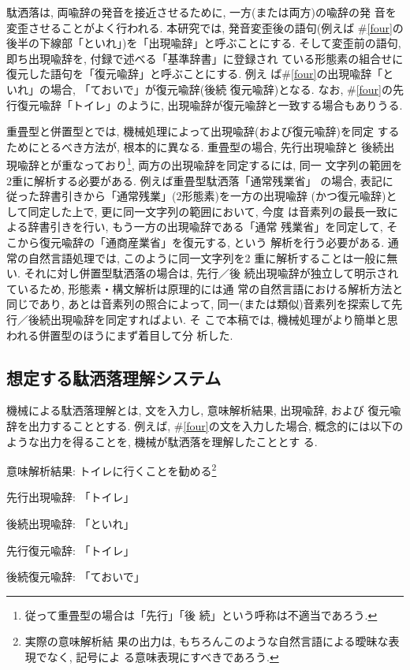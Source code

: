 駄洒落は, 両喩辞の発音を接近させるために, 一方(または両方)の喩辞の発
音を変歪させることがよく行われる. 本研究では, 発音変歪後の語句(例えば
\#\ref{four}の後半の下線部「といれ」)を「出現喩辞」と呼ぶことにする. 
そして変歪前の語句, 即ち出現喩辞を, 付録で述べる「基準辞書」に登録され
ている形態素の組合せに復元した語句を「復元喩辞」と呼ぶことにする. 例え
ば\#\ref{four}の出現喩辞「といれ」の場合, 「ておいで」が復元喩辞(後続
復元喩辞)となる. なお, \#\ref{four}の先行復元喩辞「トイレ」のように, 
出現喩辞が復元喩辞と一致する場合もありうる.  
 
重畳型と併置型とでは, 機械処理によって出現喩辞(および復元喩辞)を同定
するためにとるべき方法が, 根本的に異なる. 重畳型の場合, 先行出現喩辞と
後続出現喩辞とが重なっており\footnote{従って重畳型の場合は「先行」「後
続」という呼称は不適当であろう. }, 両方の出現喩辞を同定するには, 同一 
文字列の範囲を2重に解析する必要がある. 例えば重畳型駄洒落「通常残業省」
の場合, 表記に従った辞書引きから「通常残業」(2形態素)を一方の出現喩辞
(かつ復元喩辞)として同定した上で, 更に同一文字列の範囲において, 今度
は音素列の最長一致による辞書引きを行い, もう一方の出現喩辞である「通常
残業省」を同定して, そこから復元喩辞の「通商産業省」を復元する, という
解析を行う必要がある. 通常の自然言語処理では, このように同一文字列を2
重に解析することは一般に無い. それに対し併置型駄洒落の場合は, 先行／後
続出現喩辞が独立して明示されているため, 形態素・構文解析は原理的には通
常の自然言語における解析方法と同じであり, あとは音素列の照合によって, 
同一(または類似)音素列を探索して先行／後続出現喩辞を同定すればよい. そ
こで本稿では, 機械処理がより簡単と思われる併置型のほうにまず着目して分
析した.  

\subsection{想定する駄洒落理解システム}

機械による駄洒落理解とは, 文を入力し, 意味解析結果, 出現喩辞, および
復元喩辞を出力することとする. 例えば, \#\ref{four}の文を入力した場合, 
概念的には以下のような出力を得ることを, 機械が駄洒落を理解したこととす
る. 

\vspace*{1em}\begin{list}{}{}
\item 意味解析結果: トイレに行くことを勧める\footnote{実際の意味解析結
果の出力は, もちろんこのような自然言語による曖昧な表現でなく, 記号によ
る意味表現にすべきであろう. } 
\item 先行出現喩辞: 「トイレ」
\item 後続出現喩辞: 「といれ」
\item 先行復元喩辞: 「トイレ」
\item 後続復元喩辞: 「ておいで」
\end{list}\vspace*{1em}


